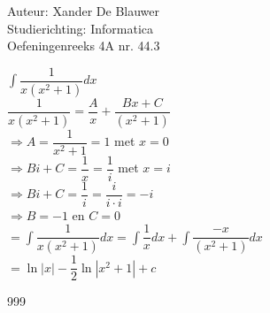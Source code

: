 \documentclass[a4paper]{article}
\begin{document}
\noindent \large Auteur: Xander De Blauwer \\
\noindent \large Studierichting: Informatica\\
\noindent \large Oefeningenreeks 4A nr. 44.3\\

\medskip

\normalsize

$ \displaystyle\int \dfrac{1}{x(x^2+1)}dx $ \\

$ \dfrac{1}{x(x^2+1)} = \dfrac{A}{x} + \dfrac{Bx + C}{(x^2+1)}$ \\

$ \Rightarrow A = \dfrac{1}{x^2 + 1} = 1 $ met $ x = 0$ \\

$ \Rightarrow Bi + C = \dfrac{1}{x} = \dfrac{1}{i}$ met  $ x = i$ \\

$ \Rightarrow Bi + C = \dfrac{1}{i} = \dfrac{i}{i \cdot i} = -i$ \\

$ \Rightarrow B = -1 $ en $ C = 0 $ \\

$ = \displaystyle\int \dfrac{1}{x(x^2+1)}dx = \displaystyle\int \dfrac{1}{x}dx + \displaystyle\int \dfrac{-x}{(x^2 + 1)}dx $ \\

$ = \ln|x| - \dfrac{1}{2}\ln|x^2 + 1| + c$ \\ 



\begin{thebibliography}{999}
\end{thebibliography}
\end{document}

